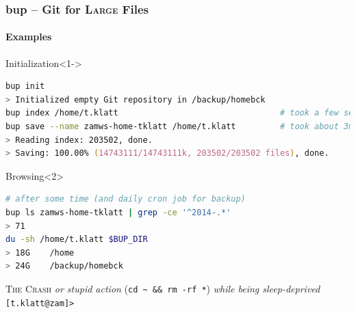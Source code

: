 \documentclass[english,hyperref={pdfpagelabels=false},aspectratio=1610]{beamer}
\begin{document}
\begin{frame}[fragile]
  \frametitle{bup -- Git for \textsc{Large} Files}
  \framesubtitle{Examples}
  \begin{block}{Initialization}<1->
    \vspace{-0.75em}
    \begin{lstlisting}[language=zsh]
bup init
> Initialized empty Git repository in /backup/homebck
bup index /home/t.klatt                                 # took a few seconds
bup save --name zamws-home-tklatt /home/t.klatt         # took about 3min
> Reading index: 203502, done.
> Saving: 100.00% (14743111/14743111k, 203502/203502 files), done.
    \end{lstlisting}
    \vspace{-0.75em}
  \end{block}
  \begin{block}{Browsing}<2>
    \vspace{-0.75em}
    \begin{lstlisting}[language=zsh]
# after some time (and daily cron job for backup)
bup ls zamws-home-tklatt | grep -ce '^2014-.*'
> 71
du -sh /home/t.klatt $BUP_DIR
> 18G    /home
> 24G    /backup/homebck
    \end{lstlisting}
    \vspace{-0.75em}
  \end{block}
\end{frame}

{
\begin{frame}[plain]
  \centering
  \color{white}
  {\Huge \textsc{The Crash}}
  \vfill
  {\scriptsize \emph{or stupid action} {\color{fzjgray50}(\texttt{cd \textasciitilde~\&\& rm -rf *})} \emph{while being sleep-deprived}}
  \vfill
  \color{green}
  \texttt{[t.klatt@zam]>\textunderscore}
\end{frame}
}
\end{document}
